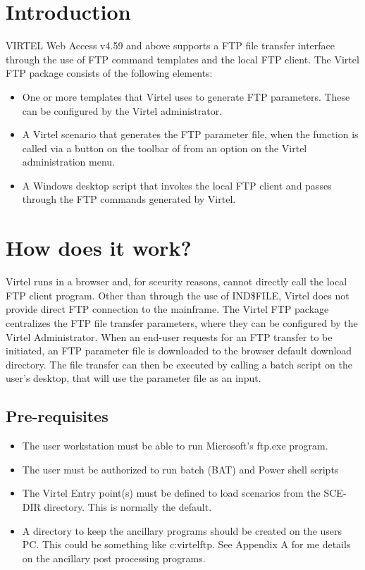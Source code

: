 \documentclass[letterpaper,10pt,english]{sphinxmanual}
\begin{document}
\section{Introduction}
\label{\detokenize{Customization:id1}}
VIRTEL Web Access v4.59 and above supports a FTP file transfer interface through the use of FTP command templates and the local FTP client. The Virtel FTP package consists of the following elements:
\begin{itemize}
\item {} 
One or more templates that Virtel uses to generate FTP parameters. These can be configured by the Virtel administrator.

\item {} 
A Virtel scenario that generates the FTP parameter file, when the function is called via a button on the toolbar of from an option on the Virtel administration menu.

\item {} 
A Windows desktop script that invokes the local FTP client and passes through the FTP commands generated by Virtel.

\end{itemize}


\section{How does it work?}
\label{\detokenize{Customization:how-does-it-work}}
Virtel runs in a browser and, for sceurity reasons, cannot directly call the local FTP client program. Other than through the use of IND\$FILE, Virtel does not provide direct FTP connection to the mainframe. The Virtel FTP package centralizes the FTP file transfer parameters, where they can be configured by the Virtel Administrator. When an end-user requests for an FTP transfer to be initiated, an FTP parameter file is downloaded to the browser default download directory. The file transfer can then be executed by calling a batch script on the user’s desktop, that will use the parameter file as an input.


\subsection{Pre-requisites}
\label{\detokenize{Customization:pre-requisites}}\begin{itemize}
\item {} 
The user workstation must be able to run Microsoft’s ftp.exe program.

\item {} 
The user must be authorized to run batch (BAT) and Power shell scripts

\item {} 
The Virtel Entry point(s) must be defined to load scenarios from the SCE-DIR directory. This is normally the default.

\item {} 
A directory to keep the ancillary programs should be created on the users PC. This could be something like c:virtelftp. See Appendix A for me details on the ancillary post processing programs.

\end{itemize}
\end{document}
